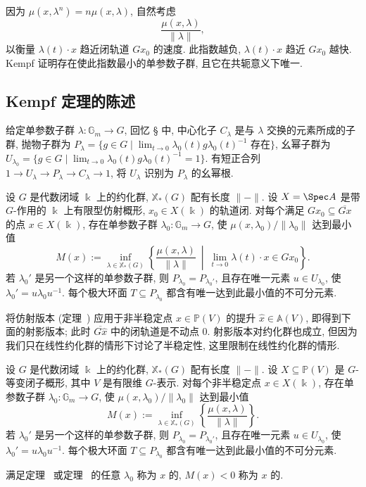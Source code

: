 因为 $\mu(x,\lambda^n)=n\mu(x,\lambda)$, 自然考虑
\[
\frac{\mu(x,\lambda)}{\|\lambda\|},
\]
以衡量 $\lambda(t)\cdot x$ 趋近闭轨道 $Gx_0$ 的速度. 此指数越负, $\lambda(t)\cdot x$ 趋近 $Gx_0$ 越快. Kempf 证明存在使此指数最小的单参数子群, 且它在共轭意义下唯一.
\subsection{Kempf 定理的陈述}\label{src:8.6.2-subsection}
给定单参数子群 $\lambda:\mathbb G_m\to G$, 回忆 \S{} 中, 中心化子 $C_\lambda$ 是与 $\lambda$ 交换的元素所成的子群, 抛物子群为 $P_\lambda=\{g\in G\mid\lim_{t\to0}\lambda_0(t)g\lambda_0(t)^{-1}\text{ 存在}\}$, 幺幂子群为 $U_{\lambda_0}=\{g\in G\mid\lim_{t\to0}\lambda_0(t)g\lambda_0(t)^{-1}=1\}$. 有短正合列 $1\to U_\lambda\to P_\lambda\to C_\lambda\to1$, 将 $U_\lambda$ 识别为 $P_\lambda$ 的幺幂根.
\begin{theorem}\label{src:8.6.5}
设 $G$ 是代数闭域 $\Bbbk$ 上的约化群, $\mathbb X_*(G)$ 配有长度 $\|-\|$. 设 $X=\Spec A$ 是带 $G$-作用的 $\Bbbk$ 上有限型仿射概形, $x_0\in X(\Bbbk)$ 的轨道闭. 对每个满足 $Gx_0\subseteq\overline{Gx}$ 的点 $x\in X(\Bbbk)$, 存在单参数子群 $\lambda_0:\mathbb G_m\to G$, 使 $\mu(x,\lambda_0)/\|\lambda_0\|$ 达到最小值
\[
M(x):=\inf_{\lambda\in\mathbb X_*(G)}\left\{\frac{\mu(x,\lambda)}{\|\lambda\|}\ \middle|\ \lim_{t\to0}\lambda(t)\cdot x\in Gx_0\right\}.
\]
若 $\lambda_0'$ 是另一个这样的单参数子群, 则 $P_{\lambda_0}=P_{\lambda_0'}$, 且存在唯一元素 $u\in U_{\lambda_0}$, 使 $\lambda_0'=u\lambda_0u^{-1}$. 每个极大环面 $T\subseteq P_{\lambda_0}$ 都含有唯一达到此最小值的不可分元素.
\end{theorem}
将仿射版本 (定理~) 应用于非半稳定点 $x\in\mathbb P(V)$ 的提升 $\widehat x\in\mathbb A(V)$, 即得到下面的射影版本; 此时 $\overline{G\widehat x}$ 中的闭轨道是不动点 $0$. 射影版本对约化群也成立, 但因为我们只在线性约化群的情形下讨论了半稳定性, 这里限制在线性约化群的情形.
\begin{theorem}\label{src:8.6.6}
设 $G$ 是代数闭域 $\Bbbk$ 上的约化群, $\mathbb X_*(G)$ 配有长度 $\|-\|$. 设 $X\subseteq\mathbb P(V)$ 是 $G$-等变闭子概形, 其中 $V$ 是有限维 $G$-表示. 对每个非半稳定点 $x\in X(\Bbbk)$, 存在单参数子群 $\lambda_0:\mathbb G_m\to G$, 使 $\mu(x,\lambda_0)/\|\lambda_0\|$ 达到最小值
\[
M(x):=\inf_{\lambda\in\mathbb X_*(G)}\left\{\frac{\mu(x,\lambda)}{\|\lambda\|}\right\}.
\]
若 $\lambda_0'$ 是另一个这样的单参数子群, 则 $P_{\lambda_0}=P_{\lambda_0'}$, 且存在唯一元素 $u\in U_{\lambda_0}$, 使 $\lambda_0'=u\lambda_0u^{-1}$. 每个极大环面 $T\subseteq P_{\lambda_0}$ 都含有唯一达到此最小值的不可分元素.
\end{theorem}
\begin{definition}\label{src:8.6.7}
满足定理~ 或定理~ 的任意 $\lambda_0$ 称为 $x$ 的, $M(x)<0$ 称为 $x$ 的.
\end{definition}
